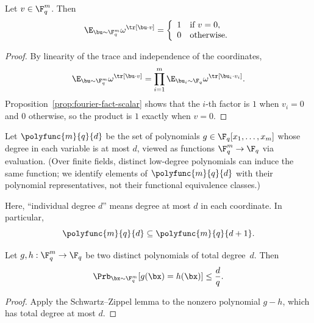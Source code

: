 \begin{lemma}\label{prop:fourier-fact-vector}
	\leanok
	Let $v \in \F_q^m$. Then
	\begin{equation*}
		\E_{\bu \sim \F_q^m} \omega^{\tr[\bu \cdot v]}
		= \left\{\begin{array}{rl}
			1 & \text{if $v = 0$}, \\
			0 & \text{otherwise}.
		\end{array}\right.
	\end{equation*}
\end{lemma}
\begin{proof}
	\leanok
	By linearity of the trace and independence of the coordinates,
	\[
		\E_{\bu \sim \F_q^m} \omega^{\tr[\bu \cdot v]}
		= \prod_{i=1}^m \E_{\bu_i \sim \F_q} \omega^{\tr[\bu_i \cdot v_i]}.
	\]
	Proposition~\ref{prop:fourier-fact-scalar} shows that the $i$-th factor is $1$ when $v_i=0$ and $0$ otherwise, so the product is $1$ exactly when $v=0$.
\end{proof}

\begin{definition}\label{def:polyfunc}
	\leanok
	Let $\polyfunc{m}{q}{d}$ be the set of polynomials $g \in \F_q[x_1,\dots,x_m]$ whose degree in each variable is at most $d$, viewed as functions $\F_q^m \to \F_q$ via evaluation. (Over finite fields, distinct low-degree polynomials can induce the same function; we identify elements of $\polyfunc{m}{q}{d}$ with their polynomial representatives, not their functional equivalence classes.)
\end{definition}

\begin{remark}\label{rem:individual-degree-convention}
	Here, ``individual degree $d$'' means degree at most $d$ in each coordinate. In
	particular,
	\[
		\polyfunc{m}{q}{d} \subseteq \polyfunc{m}{q}{d+1}.
	\]
\end{remark}

\begin{lemma}\label{lem:schwartz-zippel-total-degree}
	\leanok
	Let $g, h:\F_q^m \rightarrow \F_q$ be two distinct polynomials of total degree~$d$.
	Then
	\begin{equation*}
		\Prb_{\bx \sim \F_q^m}[g(\bx) = h(\bx)] \leq \frac{d}{q}.
	\end{equation*}
\end{lemma}
\begin{proof}
	\leanok
	Apply the Schwartz--Zippel lemma to the nonzero polynomial $g-h$, which has total degree at most $d$.
\end{proof}

